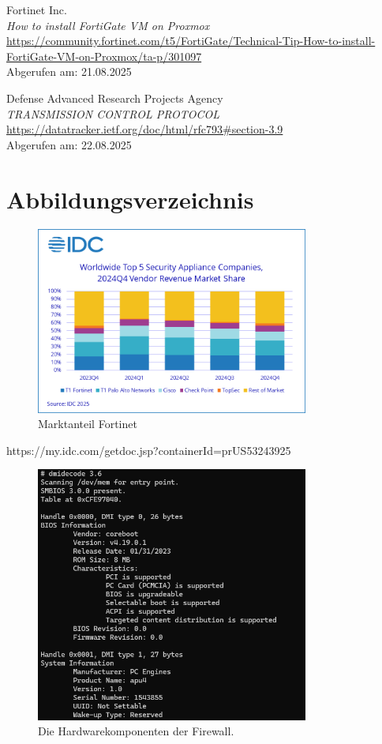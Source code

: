 \documentclass[12pt]{scrreprt}
\begin{document}
\begin{thebibliography}{99}
Fortinet Inc.\\
\emph{How to install FortiGate VM on Proxmox} \\
\url{https://community.fortinet.com/t5/FortiGate/Technical-Tip-How-to-install-FortiGate-VM-on-Proxmox/ta-p/301097}\\
Abgerufen am: 21.08.2025


Defense Advanced Research Projects Agency\\
\emph{TRANSMISSION CONTROL PROTOCOL} \\
\url{https://datatracker.ietf.org/doc/html/rfc793#section-3.9}\\
Abgerufen am: 22.08.2025

\chapter{Abbildungsverzeichnis}

	 \begin{figure}[h!]
	\centering
	\includegraphics[width=0.8\textwidth]{Fortinet_Marktanteile.png}
	\caption{Marktanteil Fortinet}
	\label{fig:ER-Modell}
\end{figure}
https://my.idc.com/getdoc.jsp?containerId=prUS53243925


\begin{figure}[htbp]
	\centering
	\includegraphics[width=0.8\textwidth]{opnsense-hardware.png}
	\caption{Die Hardwarekomponenten der Firewall.}
	\label{fig:hardware-apu4} %
\end{figure}


\end{thebibliography}
\end{document}
